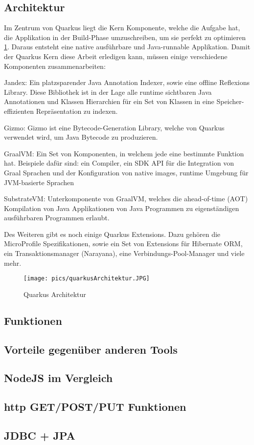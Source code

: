 \subsection{Architektur}
Im Zentrum von Quarkus liegt die Kern Komponente, welche die Aufgabe hat, die Applikation in der Build-Phase umzuschreiben, um sie perfekt zu optimieren \ref{fig:impl:QuarkusArchitektur}. Daraus entsteht eine native ausführbare und Java-runnable Applikation. Damit der Quarkus Kern diese Arbeit erledigen kann, müssen einige verschiedene Komponenten zusammenarbeiten: 

\begin{compactitem}
    \item Jandex: Ein platzsparender Java Annotation Indexer, sowie eine offline Reflexions Library. Diese Bibliothek ist in der Lage alle runtime sichtbaren Java Annotationen und Klassen Hierarchien für ein Set von Klassen in eine Speicher-effizienten Repräsentation zu indexen.     
    \item Gizmo: Gizmo ist eine Bytecode-Generation Library, welche von Quarkus verwendet wird, um Java Bytecode zu produzieren.             
    \item GraalVM: Ein Set von Komponenten, in welchem jede eine bestimmte Funktion hat. Beispiele dafür sind: ein Compiler, ein SDK API für die Integration von Graal Sprachen und der Konfiguration von native images, runtime Umgebung für JVM-basierte Sprachen
    \item SubstrateVM: Unterkomponente von GraalVM, welches die ahead-of-time (AOT) Kompilation von Java Applikationen von Java Programmen zu eigenständigen ausführbaren Programmen erlaubt.
\end{compactitem}

Des Weiteren gibt es noch einige Quarkus Extensions. Dazu gehören die MicroProfile Spezifikationen, sowie ein Set von Extensions für Hibernate ORM, ein Transaktionsmanager (Narayana), eine Verbindungs-Pool-Manager und viele mehr. 

\begin{figure}
    \centering
    \texttt{[image: pics/quarkusArchitektur.JPG]}
    \caption{Quarkus Architektur}
    \label{fig:impl:QuarkusArchitektur}
\end{figure}

\subsection{Funktionen}
\subsection{Vorteile gegenüber anderen Tools}
\subsection{NodeJS im Vergleich}
\subsection{http GET/POST/PUT Funktionen}
\subsection{JDBC + JPA}
